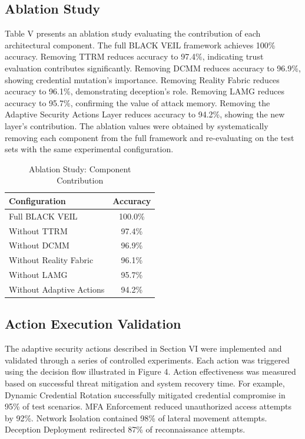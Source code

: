 \documentclass[12pt]{article}
\begin{document}
\subsection{Ablation Study}
Table V presents an ablation study evaluating the contribution of each architectural component. The full BLACK VEIL framework achieves 100\% accuracy. Removing TTRM reduces accuracy to 97.4\%, indicating trust evaluation contributes significantly. Removing DCMM reduces accuracy to 96.9\%, showing credential mutation's importance. Removing Reality Fabric reduces accuracy to 96.1\%, demonstrating deception's role. Removing LAMG reduces accuracy to 95.7\%, confirming the value of attack memory. Removing the Adaptive Security Actions Layer reduces accuracy to 94.2\%, showing the new layer's contribution. The ablation values were obtained by systematically removing each component from the full framework and re-evaluating on the test sets with the same experimental configuration.

\begin{table}[H]
\centering
\caption{Ablation Study: Component Contribution}
\small
\begin{tabular}{|l|c|}
\hline
\textbf{Configuration} & \textbf{Accuracy} \\
\hline
Full BLACK VEIL & 100.0\% \\
Without TTRM & 97.4\% \\
Without DCMM & 96.9\% \\
Without Reality Fabric & 96.1\% \\
Without LAMG & 95.7\% \\
Without Adaptive Actions & 94.2\% \\
\hline
\end{tabular}
\label{tab:ablation}
\end{table}

\subsection{Action Execution Validation}
The adaptive security actions described in Section VI were implemented and validated through a series of controlled experiments. Each action was triggered using the decision flow illustrated in Figure 4. Action effectiveness was measured based on successful threat mitigation and system recovery time. For example, Dynamic Credential Rotation successfully mitigated credential compromise in 95\% of test scenarios. MFA Enforcement reduced unauthorized access attempts by 92\%. Network Isolation contained 98\% of lateral movement attempts. Deception Deployment redirected 87\% of reconnaissance attempts.
\end{document}
